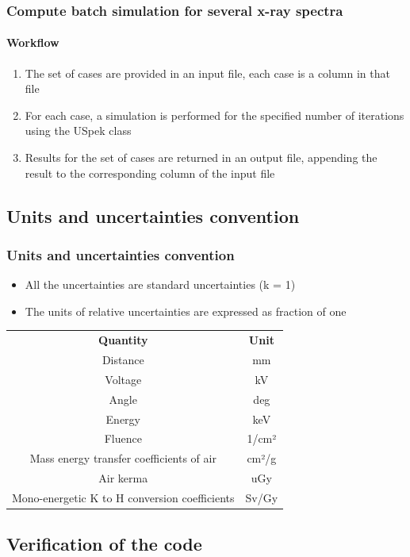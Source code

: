 \documentclass{beamer}
\newcommand{\highlight}[1]{{\color{blue} #1}}
\begin{document}
	\begin{frame}
		\frametitle{Compute batch simulation for several x-ray spectra}
		\framesubtitle{Workflow}
		\begin{enumerate}
			\setlength\itemsep{1em}
			\item The set of cases are provided in an \highlight{input file}, each case is a column in that file
			\item For each case, a \highlight{simulation} is performed for the specified number of iterations using the USpek class
			\item Results for the set of cases are returned in an \highlight{output file}, appending the result to the corresponding column of the input file
		\end{enumerate}
	\end{frame}
	
	\subsection{Units and uncertainties convention}
	
	\begin{frame}
		\frametitle{Units and uncertainties convention}
		\begin{itemize}
			\item All the uncertainties are standard uncertainties (k = 1)
			\item The units of relative uncertainties are expressed as fraction of one
		\end{itemize}
		\bigskip
		\centering
		\rowcolors{2}{gray!15}{white}
		\begin{tabular}{cc}
			\rowcolor{blue!25}
			\textbf{Quantity}&\textbf{Unit}\\
			Distance&mm\\
			Voltage&kV\\
			Angle&deg\\
			Energy&keV\\
			Fluence&1/cm²\\
			Mass energy transfer coefficients of air&cm²/g\\
			Air kerma&uGy\\
			Mono-energetic K to H conversion coefficients&Sv/Gy\\
		\end{tabular}
	\end{frame}
	
	\subsection{Verification of the code}
	
\end{document}
